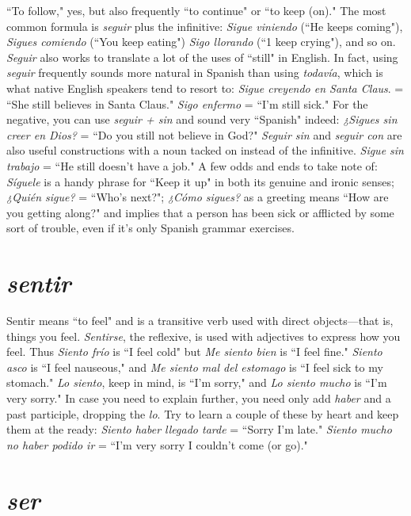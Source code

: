 ``To follow," yes, but also frequently ``to continue" or ``to keep
(on)." The most common formula is \emph{seguir} plus the infinitive: \emph{Sigue
	viniendo} (``He keeps coming"), \emph{Sigues comiendo} (``You keep eating")
\emph{Sigo llorando} (``1 keep crying"), and so on. \emph{Seguir} also works to translate a lot of the uses of ``still" in English. In fact, using \emph{seguir} frequently sounds more natural in Spanish than using \emph{todavía}, which
is what native English speakers tend to resort to: \emph{Sigue creyendo en
	Santa Claus}. = ``She still believes in Santa Claus." \emph{Sigo enfermo} =
``I'm still sick." For the negative, you can use \emph{seguir + sin} and sound
very ``Spanish" indeed: \emph{¿Sigues sin creer en Dios?} = ``Do you still not
believe in God?" \emph{Seguir sin} and \emph{seguir con} are also useful constructions with a noun tacked on instead of the infinitive. \emph{Sigue sin trabajo}
= ``He still doesn't have a job." A few odds and ends to take note of:
\emph{Síguele} is a handy phrase for ``Keep it up" in both its genuine and
ironic senses; \emph{¿Quién sigue?} = ``Who's next?"; \emph{¿Cómo sigues?} as a
greeting means ``How are you getting along?" and implies that a person
has been sick or afflicted by some sort of trouble, even if it's only Spanish grammar exercises.

\section{\emph{sentir}}

Sentir means ``to feel" and is a transitive verb used with direct
objects---that is, things you feel. \emph{Sentirse}, the reflexive, is used with
adjectives to express how you feel. Thus \emph{Siento frío} is ``I feel cold" but
\emph{Me siento bien} is ``I feel fine." \emph{Siento asco} is ``I feel nauseous," and
\emph{Me siento mal del estomago} is ``I feel sick to my stomach." \emph{Lo siento},
keep in mind, is ``I'm sorry," and \emph{Lo siento mucho} is ``I'm very sorry."
In case you need to explain further, you need only add \emph{haber} and a past
participle, dropping the \emph{lo}. Try to learn a couple of these by heart and
keep them at the ready: \emph{Siento haber llegado tarde} = ``Sorry I'm
late." \emph{Siento mucho no haber podido ir} = ``I'm very sorry I couldn't
come (or go)."

\section{\emph{ser}}

